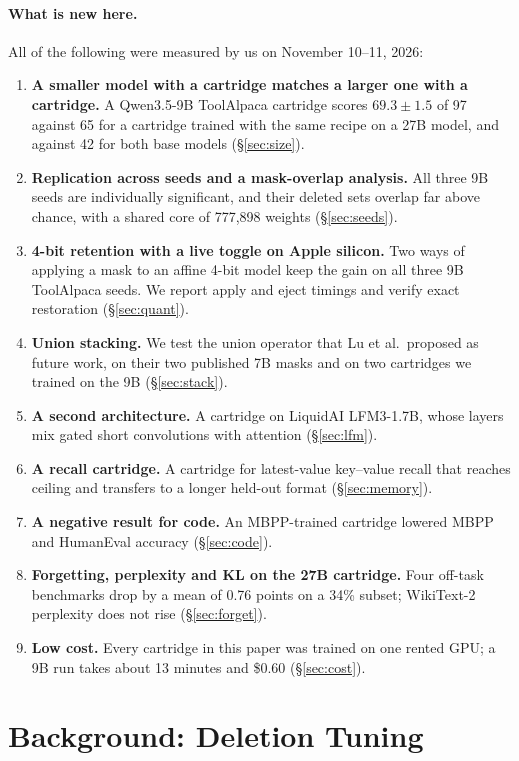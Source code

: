 \documentclass[11pt]{article}
\begin{document}
\paragraph{What is new here.} All of the following were measured by us on November 10--11, 2026:
\begin{enumerate}
\item \textbf{A smaller model with a cartridge matches a larger one with a cartridge.} A Qwen3.5-9B ToolAlpaca cartridge scores $69.3 \pm 1.5$ of 97 against 65 for a cartridge trained with the same recipe on a 27B model, and against 42 for both base models (\S\ref{sec:size}).
\item \textbf{Replication across seeds and a mask-overlap analysis.} All three 9B seeds are individually significant, and their deleted sets overlap far above chance, with a shared core of 777,898 weights (\S\ref{sec:seeds}).
\item \textbf{4-bit retention with a live toggle on Apple silicon.} Two ways of applying a mask to an affine 4-bit model keep the gain on all three 9B ToolAlpaca seeds. We report apply and eject timings and verify exact restoration (\S\ref{sec:quant}).
\item \textbf{Union stacking.} We test the union operator that Lu et al.\ proposed as future work, on their two published 7B masks and on two cartridges we trained on the 9B (\S\ref{sec:stack}).
\item \textbf{A second architecture.} A cartridge on LiquidAI LFM3-1.7B, whose layers mix gated short convolutions with attention (\S\ref{sec:lfm}).
\item \textbf{A recall cartridge.} A cartridge for latest-value key--value recall that reaches ceiling and transfers to a longer held-out format (\S\ref{sec:memory}).
\item \textbf{A negative result for code.} An MBPP-trained cartridge lowered MBPP and HumanEval accuracy (\S\ref{sec:code}).
\item \textbf{Forgetting, perplexity and KL on the 27B cartridge.} Four off-task benchmarks drop by a mean of 0.76 points on a 34\% subset; WikiText-2 perplexity does not rise (\S\ref{sec:forget}).
\item \textbf{Low cost.} Every cartridge in this paper was trained on one rented GPU; a 9B run takes about 13 minutes and \$0.60 (\S\ref{sec:cost}).
\end{enumerate}

\section{Background: Deletion Tuning}
\label{sec:bg}
\end{document}
